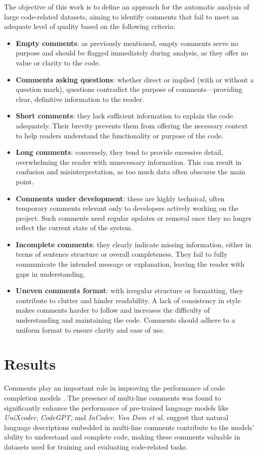 \noindent The objective of this work is to define an approach for the automatic analysis of large code-related datasets, aiming to identify comments that fail to meet an adequate level of quality based on the following criteria:
\begin{itemize}
	\item \textbf{Empty comments}: as previously mentioned, empty comments serve no purpose and should be flagged immediately during analysis, as they offer no value or clarity to the code.
	\item \textbf{Comments asking questions}: whether direct or implied (with or without a question mark), questions contradict the purpose of comments—providing clear, definitive information to the reader.
	\item \textbf{Short comments}: they lack sufficient information to explain the code adequately. Their brevity prevents them from offering the necessary context to help readers understand the functionality or purpose of the code.
	\item \textbf{Long comments}: conversely, they tend to provide excessive detail, overwhelming the reader with unnecessary information. This can result in confusion and misinterpretation, as too much data often obscures the main point.
	\item \textbf{Comments under development}: these are highly technical, often temporary comments relevant only to developers actively working on the project. Such comments need regular updates or removal once they no longer reflect the current state of the system.
	\item \textbf{Incomplete comments}: they clearly indicate missing information, either in terms of sentence structure or overall completeness. They fail to fully communicate the intended message or explanation, leaving the reader with gaps in understanding.
	\item \textbf{Uneven comments format}: with irregular structure or formatting, they contribute to clutter and hinder readability. A lack of consistency in style makes comments harder to follow and increases the difficulty of understanding and maintaining the code. Comments should adhere to a uniform format to ensure clarity and ease of use.
\end{itemize}

\section{Results}
Comments play an important role in improving the performance of code completion models \cite{vandam2023}.
The presence of multi-line comments was found to significantly enhance the performance of pre-trained language models like \textit{UniXcoder}, \textit{CodeGPT}, and \textit{InCoder}. \textit{Van Dam et al.} suggest that natural language descriptions embedded in multi-line comments contribute to the models' ability to understand and complete code, making these comments valuable in datasets used for training and evaluating code-related tasks.

